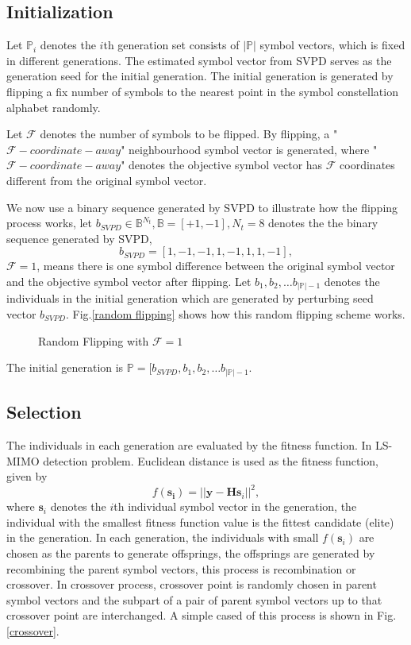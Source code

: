\subsection{Initialization}
Let $\mathbb{P}_{i}$ denotes the $i$th generation set consists of $|\mathbb{P}|$ symbol vectors, which is fixed in different generations. The estimated symbol vector from SVPD serves as the generation seed for the initial generation. The initial generation is generated by flipping a fix number of symbols to the nearest point in the symbol constellation alphabet randomly.

Let $\mathcal{F}$ denotes the number of symbols to be flipped. By flipping, a "$\mathcal{F}-coordinate-away$" neighbourhood symbol vector is generated, where "$\mathcal{F}-coordinate-away$" denotes the objective symbol vector has $\mathcal{F}$ coordinates different from the original symbol vector.

We now use a binary sequence generated by SVPD to illustrate how the flipping process works, let $b_{SVPD}\in \mathbb{B}^{N_{t}}, \mathbb{B}=[+1, -1], N_{t}=8$ denotes the the binary sequence generated by SVPD, 
\begin{equation}
b_{SVPD}=[1, -1, -1, 1, -1, 1, 1, -1],
\end{equation}  
$\mathcal{F}=1$, means there is one symbol difference between the original symbol vector and the objective symbol vector after flipping. Let $b_{1}, b_{2}, \ldots b_{|\mathbb{P}|-1}$ denotes the individuals in the initial generation which are generated by perturbing seed vector $b_{SVPD}$. Fig.\ref{random flipping} shows how this random flipping scheme works.
\begin{figure}
\centering
\def\svgwidth{\columnwidth}

\caption{Random Flipping with $\mathcal{F}=1$}
\label{random fipping}
\end{figure}
The initial generation is $\mathbb{P}=[b_{SVPD}, b_{1}, b_{2}, \ldots b_{|\mathbb{P}|-1}$.
\subsection{Selection}
The individuals in each generation are evaluated by the fitness function. In LS-MIMO detection problem. Euclidean distance is used as the fitness function, given by 
\begin{equation}
f(\mathbf{s_{i}})=||\mathbf{y}-\mathbf{H}\mathbf{s}_{i}||^{2}, 
\label{fitness function}
\end{equation}
where $\mathbf{s}_{i}$ denotes the $i$th individual symbol vector in the generation, the individual with the smallest fitness function value is the fittest candidate (elite) in the generation.
In each generation, the individuals with small $f(\mathbf{s}_{i})$ are chosen as the parents to generate offsprings, the offsprings are generated by recombining the parent symbol vectors, this process is recombination or crossover. In crossover process, crossover point is randomly chosen in parent symbol vectors and the subpart of a pair of parent symbol vectors up to that crossover point are interchanged. A simple cased of this process is shown in Fig.\ref{crossover}.

